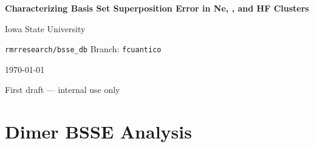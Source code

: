 \documentclass[12pt, letterpaper]{report}
\begin{document}
\begin{titlepage}
  \centering
  \vspace*{2cm}
  {\LARGE\bfseries Characterizing Basis Set Superposition Error in Ne, , and HF Clusters\par}
  \vspace{2cm}
  {\large Iowa State University\par}
  \vspace{0.5cm}
  {\large \texttt{rmrresearch/bsse\_db} \textbar{} Branch: \texttt{fcuantico}\par}
  \vspace{1cm}
  {\large \today\par}
  \vfill
  {\normalsize First draft --- internal use only}
\end{titlepage}

\tableofcontents
\clearpage

%

%

\chapter{Dimer BSSE Analysis}


%
\end{document}
